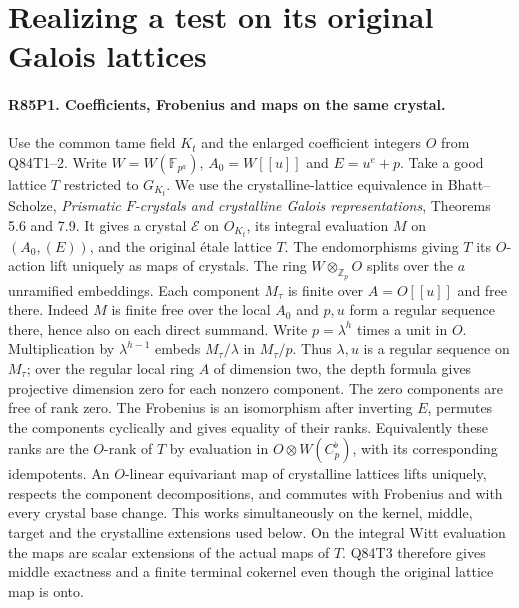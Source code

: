 \section{Realizing a test on its original Galois lattices}

\paragraph{R85P1. Coefficients, Frobenius and maps on the same crystal.}
Use the common tame field $K_t$ and the enlarged coefficient integers
$O$ from Q84T1--2. Write $W=W(\mathbb F_{p^a})$, $A_0=W[[u]]$ and
$E=u^e+p$. Take a good lattice $T$ restricted to $G_{K_t}$.
We use the crystalline-lattice equivalence in Bhatt--Scholze,
\emph{Prismatic $F$-crystals and crystalline Galois representations},
Theorems 5.6 and 7.9. It gives a crystal $\mathscr E$ on $O_{K_t}$,
its integral evaluation $M$ on $(A_0,(E))$, and the original
\'{e}tale lattice $T$. The endomorphisms giving $T$ its
$O$-action lift uniquely as maps of crystals. The ring
$W\otimes_{\mathbb Z_p} O$ splits over the $a$ unramified embeddings.
Each component $M_\tau$ is finite over $A=O[[u]]$ and free there.
Indeed $M$ is finite free over the local $A_0$ and $p,u$ form a
regular sequence there, hence also on each direct summand. Write
$p=\lambda^h$ times a unit in $O$. Multiplication by $\lambda^{h-1}$
embeds $M_\tau/\lambda$ in $M_\tau/p$. Thus $\lambda,u$ is a
regular sequence on $M_\tau$; over the regular local ring $A$ of
dimension two, the depth formula gives projective dimension zero
for each nonzero component. The zero components are free of rank zero.
The Frobenius is an isomorphism after inverting $E$, permutes
the components cyclically and gives equality of their ranks.
Equivalently these ranks are the $O$-rank of $T$ by evaluation in
$O\otimes W(C_p^\flat)$, with its corresponding idempotents.
An $O$-linear equivariant map of crystalline lattices lifts uniquely,
respects the component decompositions, and commutes with Frobenius
and with every crystal base change. This works simultaneously on
the kernel, middle, target and the crystalline extensions used below.
On the integral Witt evaluation the maps are scalar extensions of
the actual maps of $T$. Q84T3 therefore gives middle exactness and
a finite terminal cokernel even though the original lattice map is onto.

